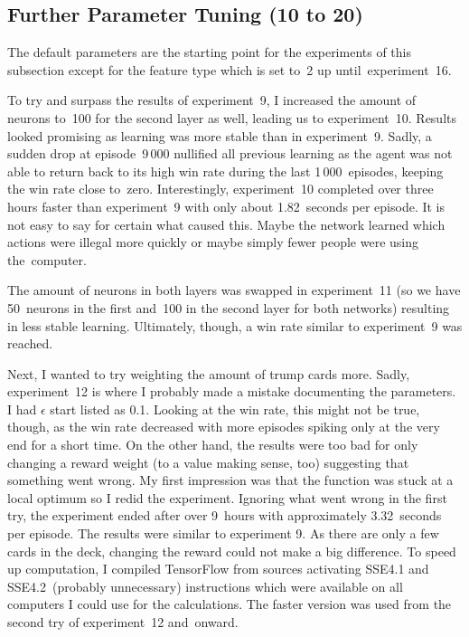 \documentclass[a4paper,titlepage]{article}
\begin{document}
\subsection{Further Parameter Tuning (10 to 20)}
\label{sec:tuning}

The default parameters are the starting point for the experiments of this subsection except for the feature type which is set to~2 up until~experiment~16.

To try and surpass the results of experiment~9, I increased the amount of neurons to~100 for the second layer as well, leading us to experiment~10. Results looked promising as learning was more stable than in experiment~9. Sadly, a sudden drop at episode~9\,000 nullified all previous learning as the agent was not able to return back to its high win rate during the last 1\,000~episodes, keeping the win rate close to~zero. Interestingly, experiment~10 completed over three hours faster than experiment~9 with only about 1.82~seconds per episode. It is not easy to say for certain what caused this. Maybe the network learned which actions were illegal more quickly or maybe simply fewer people were using the~computer.

The amount of neurons in both layers was swapped in experiment~11 (so we have 50~neurons in the first and~100 in the second layer for both networks) resulting in less stable learning. Ultimately, though, a win rate similar to experiment~9 was reached.

Next, I wanted to try weighting the amount of trump cards more. Sadly, experiment~12 is where I probably made a mistake documenting the parameters. I had $\epsilon$ start listed as 0.1. Looking at the win rate, this might not be true, though, as the win rate decreased with more episodes spiking only at the very end for a short time. On the other hand, the results were too bad for only changing a reward weight (to a value making sense, too) suggesting that something went wrong. My first impression was that the function was stuck at a local optimum so I redid the experiment. Ignoring what went wrong in the first try, the experiment ended after over 9~hours with approximately 3.32~seconds per episode. The results were similar to experiment 9. As there are only a few cards in the deck, changing the reward could not make a big difference. To speed up computation, I compiled TensorFlow from sources activating SSE4.1 and SSE4.2~(probably unnecessary) instructions which were available on all computers I could use for the calculations. The faster version was used from the second try of experiment~12 and~onward.
\end{document}
